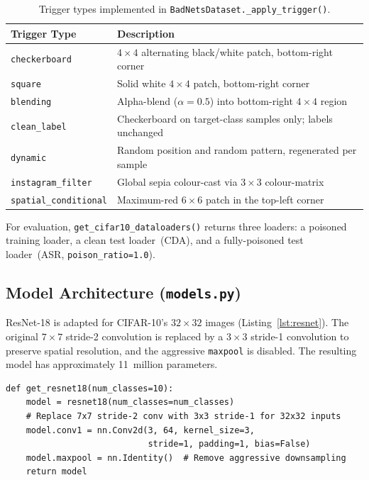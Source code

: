 \documentclass[12pt, letterpaper]{article}
\begin{document}
\begin{table}[!htbp]
  \centering
  \caption{Trigger types implemented in \texttt{BadNetsDataset.\_apply\_trigger()}.}
  \label{tab:triggers}
  \small
  \begin{tabularx}{\linewidth}{@{} l X @{}}
    \toprule
    \textbf{Trigger Type}         & \textbf{Description} \\
    \midrule
    \texttt{checkerboard}         & $4\times4$ alternating black/white patch, bottom-right corner \\
    \texttt{square}               & Solid white $4\times4$ patch, bottom-right corner \\
    \texttt{blending}             & Alpha-blend ($\alpha{=}0.5$) into bottom-right $4\times4$ region \\
    \texttt{clean\_label}         & Checkerboard on target-class samples only; labels unchanged \\
    \texttt{dynamic}              & Random position and random pattern, regenerated per sample \\
    \texttt{instagram\_filter}    & Global sepia colour-cast via $3\times3$ colour-matrix \\
    \texttt{spatial\_conditional} & Maximum-red $6\times6$ patch in the top-left corner \\
    \bottomrule
  \end{tabularx}
\end{table}


For evaluation, \texttt{get\_cifar10\_dataloaders()} returns three loaders:
a poisoned training loader, a clean test loader~(CDA), and a fully-poisoned
test loader~(ASR, \texttt{poison\_ratio=1.0}).

\subsection{Model Architecture (\texttt{models.py})}
\label{subsec:model}

ResNet-18 is adapted for CIFAR-10's $32\times32$ images
(Listing~\ref{lst:resnet}).  The original $7\times7$ stride-2 convolution
is replaced by a $3\times3$ stride-1 convolution to preserve spatial
resolution, and the aggressive \texttt{maxpool} is disabled.  The resulting
model has approximately 11~million parameters.

\begin{singlespace}
\begin{lstlisting}[style=pystyle, caption={CIFAR-10-adapted ResNet-18
  (\texttt{models.py}).}, label=lst:resnet]
def get_resnet18(num_classes=10):
    model = resnet18(num_classes=num_classes)
    # Replace 7x7 stride-2 conv with 3x3 stride-1 for 32x32 inputs
    model.conv1 = nn.Conv2d(3, 64, kernel_size=3,
                            stride=1, padding=1, bias=False)
    model.maxpool = nn.Identity()  # Remove aggressive downsampling
    return model
\end{lstlisting}
\end{singlespace}
\end{document}
